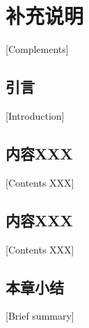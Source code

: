
\chapter{补充说明}[Complements]

\section{引言}[Introduction]

\lipsum[2]

\section{内容XXX}[Contents XXX]

\lipsum[3]

\section{内容XXX}[Contents XXX]

\lipsum[3]

\section{本章小结}[Brief summary]

\lipsum[2]
